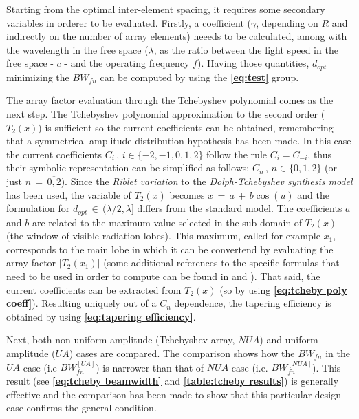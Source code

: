 \documentclass[12pt,a4paper]{article}
\begin{document}
{\begin{multicols}{2}
\indent 

Starting from the optimal inter-element spacing, it requires some secondary variables in orderer to be evaluated. Firstly, a coefficient ($\gamma$, depending on $R$ and indirectly on the number of array elements) neeeds to be calculated, among with the wavelength in the free space ($\lambda$, as the ratio between the light speed in the free space - $c$ - and the operating frequency $f$). Having those quantities, $d_{opt}$ minimizing the $BW_{fn}$ can be computed by using the \textbf{\cref{eq:test}} group. 

\indent 

The array factor evaluation through the Tchebyshev polynomial comes as the next step. The Tchebyshev polynomial approximation to the second order ($T_2(x)$) is sufficient so the current coefficients can be obtained, remembering that a symmetrical amplitude distribution hypothesis has been made. In this case the current coefficients $C_i\,,\,i\in\{-2,-1,0,1,2\}$ follow the rule $C_i=C_{-i}$, thus their symbolic representation can be simplified as follows: $C_n\,,\,n\in\{0,1,2\}$ (or just $n\,=\,\overline{0,2}$). Since the \emph{Riblet variation} to the \emph{Dolph-Tchebyshev synthesis model} has been used, the variable of $T_2(x)$ becomes $x\,=\,a\,+\,b\cos(u)$ and the formulation for $d_{opt}\,\in\,({\lambda}/{2},\lambda]$ differs from the standard model. The coefficients $a$ and $b$ are related to the maximum value selected in the sub-domain of $T_2(x)$ (the window of visible radiation lobes). This maximum, called for example $x_1$, corresponds to the main lobe in which it can be convertend by evaluating the array factor $|T_2(x_1)|$ (some additional references to the specific formulas that need to be used in order to compute can be found in \textbf{\cite{Balanis1}} and \textbf{\cite{ewa}}). That said, the current coefficients can be extracted from $T_2(x)$ (so by using \textbf{\cref{eq:tcheby poly coeff}}). Resulting uniquely out of a $C_n$ dependence, the tapering efficiency is obtained by using \textbf{\cref{eq:tapering efficiency}}.

\indent 

Next, both non uniform amplitude (Tchebyshev array, $NUA$) and uniform amplitude ($UA$)  cases are compared. The comparison shows how the $BW_{fn}$ in the $UA$ case (i.e $BW_{fn}^{[UA]}$) is narrower than that of $NUA$ case (i.e. $BW_{fn}^{[NUA]}$). This result (see \textbf{\cref{eq:tcheby beamwidth}} and \textbf{\cref{table:tcheby results}}) is generally effective and the comparison has been made to show that this particular design case confirms the general condition. 


\end{multicols}}
\end{document}
